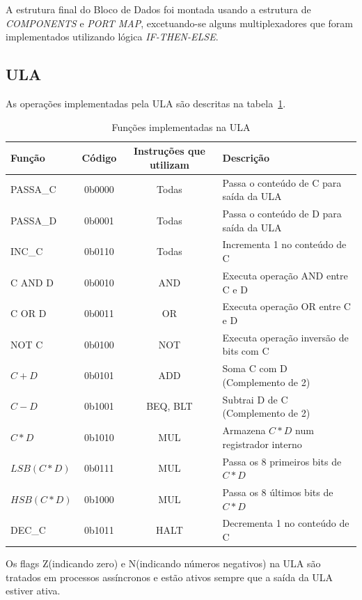 \documentclass[../main.tex]{subfiles}
\begin{document}
	A estrutura final do Bloco de Dados foi montada usando a estrutura de \textit{COMPONENTS} e \textit{PORT MAP}, excetuando-se
	alguns multiplexadores que foram implementados utilizando lógica \textit{IF-THEN-ELSE}.
	
	\subsection{ULA}
		\label{sec:ULA}
		As operações implementadas pela ULA são descritas na tabela~\ref{tab:comandos_ULA}.
		\begin{table}[H]
			\centering
			\caption{Funções implementadas na ULA}
			\begin{tabular}{|l|c|c|l|} %
			\hline
			Função & Código & Instruções que utilizam & Descrição					 		\\\hline
			PASSA\_C 	& 0b0000 	& Todas		&	Passa o conteúdo de C para saída da ULA	\\\hline
			PASSA\_D 	& 0b0001 	& Todas		&	Passa o conteúdo de D para saída da ULA	\\\hline
			INC\_C 		& 0b0110 	& Todas		&	Incrementa 1 no conteúdo de C			\\\hline
			C AND D 	& 0b0010 	& AND		&	Executa operação AND entre C e D		\\\hline
			C OR D 		& 0b0011 	& OR		&	Executa operação OR entre C e D			\\\hline
			NOT C 		& 0b0100 	& NOT		&	Executa operação inversão de bits com C	\\\hline
			$C+D$ 		& 0b0101 	& ADD		&	Soma C com D (Complemento de 2)			\\\hline						
			$C-D$ 		& 0b1001 	& BEQ, BLT	&	Subtrai D de C (Complemento de 2)		\\\hline
			$C*D$ 		& 0b1010 	& MUL		&	Armazena $C*D$ num registrador interno	\\\hline						
			$LSB(C*D)$	& 0b0111 	& MUL		&	Passa os 8 primeiros bits de $C*D$		\\\hline						
			$HSB(C*D)$	& 0b1000 	& MUL		&	Passa os 8 últimos bits de $C*D$		\\\hline						
			DEC\_C		& 0b1011 	& HALT		&	Decrementa 1 no conteúdo de C			\\\hline						
			\end{tabular}
			\label{tab:comandos_ULA}
		\end{table}
		
		Os flags Z(indicando zero) e N(indicando números negativos) na ULA são tratados em processos assíncronos 
		e estão ativos sempre que a saída da ULA estiver ativa.
		
\end{document}
